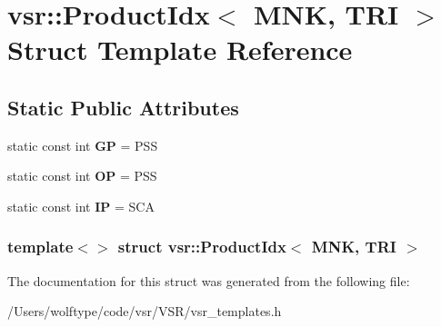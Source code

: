 \hypertarget{structvsr_1_1_product_idx_3_01_m_n_k_00_01_t_r_i_01_4}{\section{vsr\-:\-:Product\-Idx$<$ M\-N\-K, T\-R\-I $>$ Struct Template Reference}
\label{structvsr_1_1_product_idx_3_01_m_n_k_00_01_t_r_i_01_4}
}
\subsection*{Static Public Attributes}
\begin{DoxyCompactItemize}
\item 
\hypertarget{structvsr_1_1_product_idx_3_01_m_n_k_00_01_t_r_i_01_4_a0eaf24e1b188fe5ab74d8e596950e572}{static const int {\bfseries G\-P} = P\-S\-S}\label{structvsr_1_1_product_idx_3_01_m_n_k_00_01_t_r_i_01_4_a0eaf24e1b188fe5ab74d8e596950e572}

\item 
\hypertarget{structvsr_1_1_product_idx_3_01_m_n_k_00_01_t_r_i_01_4_a6ee805389596cc807879ceb45933bc49}{static const int {\bfseries O\-P} = P\-S\-S}\label{structvsr_1_1_product_idx_3_01_m_n_k_00_01_t_r_i_01_4_a6ee805389596cc807879ceb45933bc49}

\item 
\hypertarget{structvsr_1_1_product_idx_3_01_m_n_k_00_01_t_r_i_01_4_a16c34bac87f9f4030e344e5d3b15e46d}{static const int {\bfseries I\-P} = S\-C\-A}\label{structvsr_1_1_product_idx_3_01_m_n_k_00_01_t_r_i_01_4_a16c34bac87f9f4030e344e5d3b15e46d}

\end{DoxyCompactItemize}
\subsubsection*{template$<$$>$ struct vsr\-::\-Product\-Idx$<$ M\-N\-K, T\-R\-I $>$}



The documentation for this struct was generated from the following file\-:\begin{DoxyCompactItemize}
\item 
/\-Users/wolftype/code/vsr/\-V\-S\-R/vsr\-\_\-templates.\-h\end{DoxyCompactItemize}
